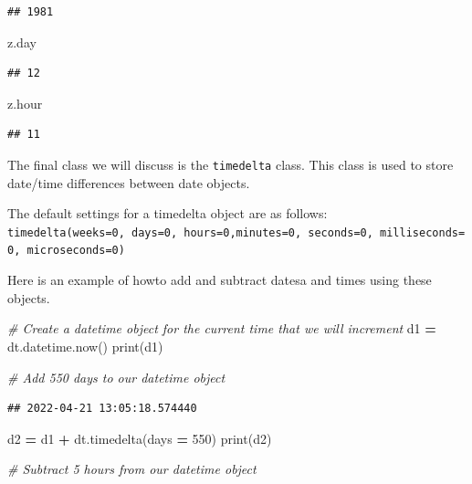 \documentclass[
]{book}
\newenvironment{Shaded}{\begin{snugshade}}{\end{snugshade}}
\newcommand{\BuiltInTok}[1]{#1}
\newcommand{\CommentTok}[1]{\textcolor[rgb]{0.56,0.35,0.01}{\textit{#1}}}
\newcommand{\DecValTok}[1]{\textcolor[rgb]{0.00,0.00,0.81}{#1}}
\newcommand{\NormalTok}[1]{#1}
\newcommand{\OperatorTok}[1]{\textcolor[rgb]{0.81,0.36,0.00}{\textbf{#1}}}
\begin{document}
\begin{verbatim}
## 1981
\end{verbatim}

\begin{Shaded}
\begin{Highlighting}[]
\NormalTok{z.day}
\end{Highlighting}
\end{Shaded}

\begin{verbatim}
## 12
\end{verbatim}

\begin{Shaded}
\begin{Highlighting}[]
\NormalTok{z.hour}
\end{Highlighting}
\end{Shaded}

\begin{verbatim}
## 11
\end{verbatim}

The final class we will discuss is the \texttt{timedelta} class. This class is used to store date/time differences between date objects.

The default settings for a timedelta object are as follows: \texttt{timedelta(weeks=0,\ days=0,\ hours=0,minutes=0,\ seconds=0,\ milliseconds=0,\ microseconds=0)}

Here is an example of howto add and subtract datesa and times using these objects.

\begin{Shaded}
\begin{Highlighting}[]
\CommentTok{\# Create a datetime object for the current time that we will increment}
\NormalTok{d1 }\OperatorTok{=}\NormalTok{ dt.datetime.now()}
\BuiltInTok{print}\NormalTok{(d1)}

\CommentTok{\# Add 550 days to our datetime object }
\end{Highlighting}
\end{Shaded}

\begin{verbatim}
## 2022-04-21 13:05:18.574440
\end{verbatim}

\begin{Shaded}
\begin{Highlighting}[]
\NormalTok{d2 }\OperatorTok{=}\NormalTok{ d1 }\OperatorTok{+}\NormalTok{ dt.timedelta(days }\OperatorTok{=} \DecValTok{550}\NormalTok{)}
\BuiltInTok{print}\NormalTok{(d2)}

\CommentTok{\# Subtract 5 hours from our datetime object }
\end{Highlighting}
\end{Shaded}
\end{document}
